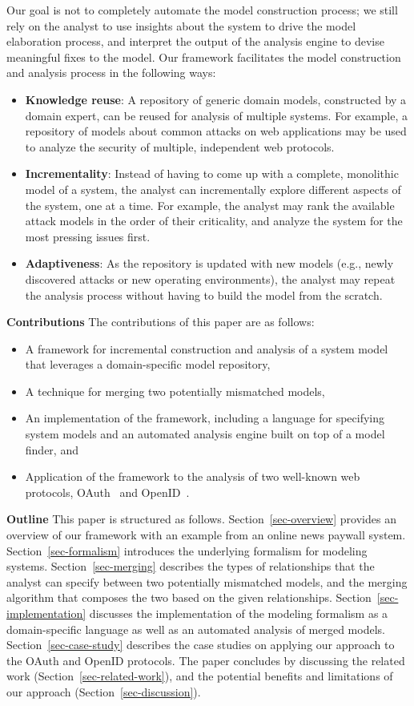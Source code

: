 Our goal is not to completely automate the model construction process;
we still rely on the analyst to use insights about the system to drive
the model elaboration process, and interpret the output of the
analysis engine to devise meaningful fixes to the model. Our framework
facilitates the model construction and analysis process in the
following ways:
\begin{itemize}
\item \textbf{Knowledge reuse}: A repository of generic domain models,
  constructed by a domain expert, can be reused for analysis of
  multiple systems. For example, a repository of models about common
  attacks on web applications may be used to analyze the security of
  multiple, independent web protocols.
\item \textbf{Incrementality}: Instead of having to come up with a
  complete, monolithic model of a system, the analyst can
  incrementally explore different aspects of the system, one at a
  time. For example, the analyst may rank the available attack models
  in the order of their criticality, and analyze the system for the
  most pressing issues first.
\item \textbf{Adaptiveness}: As the repository is updated with new
  models (e.g., newly discovered attacks or new operating environments),
  the analyst may repeat the analysis process without having to build
  the model from the scratch.
\end{itemize}

\textbf{Contributions} The contributions of this paper are as
follows:
\begin{itemize}
\item A framework for incremental construction and analysis of a
  system model that leverages a domain-specific model repository,
\item A technique for merging two potentially mismatched models,
\item An implementation of the framework, including a language for
  specifying system models and an automated analysis engine built on
  top of a model finder, and
\item Application of the framework to the analysis of two well-known
  web protocols, OAuth~\cite{oauth} and OpenID~\cite{openid}.
\end{itemize}

\textbf{Outline} This paper is structured as
follows. Section~\ref{sec-overview} provides an overview of our
framework with an example from an online news paywall system.
Section~\ref{sec-formalism} introduces the underlying formalism for
modeling systems. Section~\ref{sec-merging} describes the types of
relationships that the analyst can specify between two potentially
mismatched models, and the merging algorithm that composes the two
based on the given relationships. Section~\ref{sec-implementation}
discusses the implementation of the modeling formalism as a
domain-specific language as well as an automated analysis of merged
models. Section~\ref{sec-case-study} describes the case studies on
applying our approach to the OAuth and OpenID protocols. The paper
concludes by discussing the related work
(Section~\ref{sec-related-work}), and the potential benefits and
limitations of our approach (Section~\ref{sec-discussion}).

